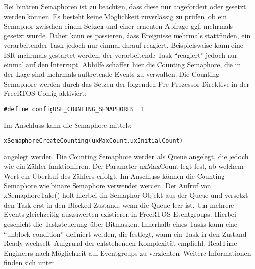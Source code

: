 Bei binären Semaphoren ist zu beachten, dass diese nur angefordert oder gesetzt werden können. Es besteht keine Mög\-lich\-keit zuverlässig zu prüfen, ob ein Semaphor zwischen einem Setzen und einer erneuten Abfrage ggf. mehrmals gesetzt wurde. Daher kann es passieren, dass Ereignisse mehrmals stattfinden, ein verarbeitender Task jedoch nur einmal darauf reagiert. Beispielsweise kann eine ISR mehrmals gestartet werden, der verarbeitende Task "`reagiert"' jedoch nur einmal auf den Interrupt.
Abhilfe schaffen hier die Counting Semaphore, die in der Lage sind mehrmals auftretende Events zu verwalten. Die Counting Semaphore werden durch das Setzen der folgenden Pre-Prozessor Direktive in der FreeRTOS Config aktiviert:
\begin{lstlisting}[numbers = none]
#define configUSE_COUNTING_SEMAPHORES  1
\end{lstlisting}
Im Anschluss kann die Semaphore mittels:
\begin{lstlisting}[numbers = none]
xSemaphoreCreateCounting(uxMaxCount,uxInitialCount) 
\end{lstlisting}
angelegt werden. Die Counting Semaphore werden als Que\-ue angelegt, die jedoch wie ein Zähler funktionieren. Der Parameter uxMaxCount legt fest, ab welchem Wert ein Überlauf des Zählers erfolgt. 
Im Anschluss kön\-nen die Counting Semaphore wie binäre Semaphore verwendet werden. Der Aufruf von xSemaphoreTake() holt hierbei ein Semaphor-Objekt aus der Queue und versetzt den Task erst in den Blocked Zustand, wenn die Queue leer ist\cite[p.191ff]{MasteringFreeRtos}.
Um mehrere Events gleichzeitig auszuwerten existieren in FreeRTOS Eventgroups. Hierbei geschieht die Tasksteuerung über Bitmasken. Innerhalb eines Tasks kann eine "`unblock condition"' definiert werden, die festlegt, wann ein Task in den Zustand Ready wechselt. Aufgrund der entstehenden Komplexität empfiehlt RealTime Engineers nach Mög\-lich\-keit auf Eventgroups zu verzichten. Weitere Informationen finden sich unter \cite[p.265ff]{MasteringFreeRtos} 
